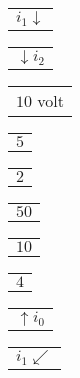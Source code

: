 \documentclass{book}
\begin{document}
{\small \renewcommand{\arraystretch}{.9}
              \begin{tabular}[t]{@{}r@{}}
                  $i_1 \downarrow$    
              \end{tabular}}%
\stopmpxshipout
\mpxshipout%
{\small \renewcommand{\arraystretch}{.9}
              \begin{tabular}[t]{@{}l@{}}
                  $\downarrow i_2$    
              \end{tabular}}%
\stopmpxshipout
\mpxshipout%
{\small \renewcommand{\arraystretch}{.9}
                \circuitfont\begin{tabular}{@{}l}
                   $10$ volt 
	        \end{tabular}}%
\stopmpxshipout
\mpxshipout%
{\small \renewcommand{\arraystretch}{.9}
              \circuitfont\begin{tabular}[t]{@{}r@{}}
                  $5$ %
              \end{tabular}}%
\stopmpxshipout
\mpxshipout%
{\small \renewcommand{\arraystretch}{.9}
              \circuitfont\begin{tabular}[t]{@{}l@{}}
                  $2$ %
              \end{tabular}}%
\stopmpxshipout
\mpxshipout%
{\small \renewcommand{\arraystretch}{.9}
              \circuitfont\begin{tabular}[b]{@{}c@{}}
                  $50$ %
              \end{tabular}}%
\stopmpxshipout
\mpxshipout%
{\small \renewcommand{\arraystretch}{.9}
              \circuitfont\begin{tabular}[t]{@{}r@{}}
                  $10$ %
              \end{tabular}}%
\stopmpxshipout
\mpxshipout%
{\small \renewcommand{\arraystretch}{.9}
              \circuitfont\begin{tabular}[t]{@{}l@{}}
                  $4$ %
              \end{tabular}}%
\stopmpxshipout
\mpxshipout%
{\small \renewcommand{\arraystretch}{.9}
              \circuitfont\begin{tabular}{@{}l}
                 $\uparrow i_0$  
	      \end{tabular}}%
\stopmpxshipout
\mpxshipout%
{\small \renewcommand{\arraystretch}{.9}
              \begin{tabular}[t]{@{}r@{}}
                  $i_1 \swarrow$    
              \end{tabular}}%
\end{document}
